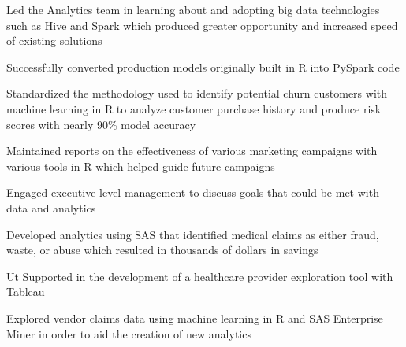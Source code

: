 \documentclass[]{plushcv}
\begin{document}
\begin{minipage}[t]{0.70\textwidth}
\begin{tightemize}
\sectionsep
\item Led the Analytics team in learning about and adopting
big data technologies such as Hive and Spark which
produced greater opportunity and increased speed of
existing solutions
\item Successfully converted production models originally
built in R into PySpark code
\item Standardized the methodology used to identify potential
churn customers with machine learning in R to analyze
customer purchase history and produce risk scores with
nearly 90\% model accuracy
\item Maintained reports on the effectiveness of various
marketing campaigns with various tools in R which
helped guide future campaigns
\item Engaged executive-level management to discuss
goals that could be met with data and analytics
\end{tightemize}
\sectionsep

\begin{tightemize}
\sectionsep
\item Developed analytics using SAS that identified medical claims as either fraud, waste, or abuse which resulted in thousands of dollars in savings
\item Ut Supported in the development of a healthcare provider exploration tool with Tableau \item Explored vendor claims data using machine learning in R and SAS Enterprise Miner in order to aid the creation of new analytics  
\end{tightemize}
\sectionsep

%
%

\end{minipage} 
\hfill
\end{document}
